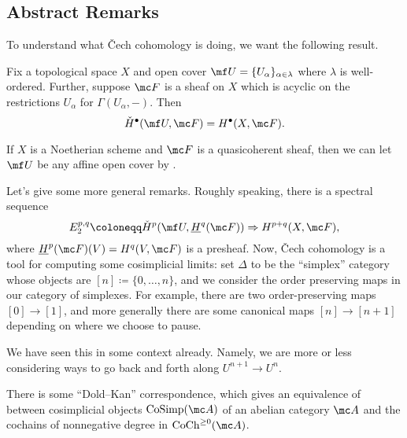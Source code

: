 \documentclass[../notes.tex]{subfiles}
\begin{document}
\subsection{Abstract Remarks}
To understand what \v Cech cohomology is doing, we want the following result.
\begin{theorem} \label{thm:cech-is-correct}
	Fix a topological space $X$ and open cover $\mf U=\{U_\alpha\}_{\alpha\in\lambda}$ where $\lambda$ is well-ordered. Further, suppose $\mc F$ is a sheaf on $X$ which is acyclic on the restrictions $U_\alpha$ for $\Gamma(U_\alpha,-)$. Then
	\[\check H^\bullet(\mf U,\mc F)=H^\bullet(X,\mc F).\]
\end{theorem}
\begin{example}
	If $X$ is a Noetherian scheme and $\mc F$ is a quasicoherent sheaf, then we can let $\mf U$ be any affine open cover by .
\end{example}
Let's give some more general remarks. Roughly speaking, there is a spectral sequence
\[E_2^{p,q}\coloneqq\check H^p(\mf U,\underline H^q(\mc F))\Rightarrow H^{p+q}(X,\mc F),\]
where $\underline H^p(\mc F)(V)=H^q(V,\mc F)$ is a presheaf. Now, \v Cech cohomology is a tool for computing some cosimplicial limits: set $\Delta$ to be the ``simplex'' category whose objects are $[n]\coloneqq\{0,\ldots,n\}$, and we consider the order preserving maps in our category of simplexes. For example, there are two order-preserving maps $[0]\to[1]$, and more generally there are some canonical maps $[n]\to[n+1]$ depending on where we choose to pause.
\begin{remark}
	We have seen this in some context already. Namely, we are more or less considering ways to go back and forth along $U^{n+1}\to U^n$.
\end{remark}
There is some ``Dold--Kan'' correspondence, which gives an equivalence of between cosimplicial objects $\mathrm{CoSimp}(\mc A)$ of an abelian category $\mc A$ and the cochains of nonnegative degree in $\mathrm{CoCh}^{\ge0}(\mc A)$.
\end{document}
